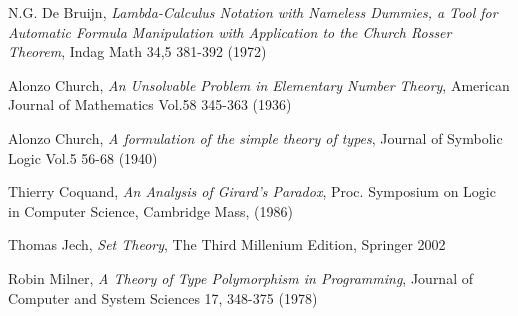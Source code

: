 \documentclass[11pt,a4paper]{article}
\begin{document}
\newpage

\newpage

\newpage

\newpage

\newpage



\begin{thebibliography}{99}

 N.G. De Bruijn, \emph{Lambda-Calculus Notation with Nameless Dummies, a Tool for Automatic Formula Manipulation with Application to the Church Rosser Theorem}, Indag Math 34,5 381-392 (1972)

 Alonzo Church, \emph{An Unsolvable Problem in Elementary Number Theory}, American Journal of Mathematics Vol.58 345-363 (1936)

 Alonzo Church, \emph{A formulation of the simple theory of types}, Journal of Symbolic Logic Vol.5 56-68 (1940)

 Thierry Coquand, \emph{An Analysis of Girard's Paradox}, Proc. Symposium on Logic in Computer Science, Cambridge Mass, (1986) 

 Thomas Jech, \emph{Set Theory}, The Third Millenium Edition, Springer 2002

 Robin Milner, \emph{A Theory of Type Polymorphism in Programming}, Journal of Computer and System Sciences 17, 348-375 (1978)

\end{thebibliography}

\twocolumn{\small}
\end{document}
